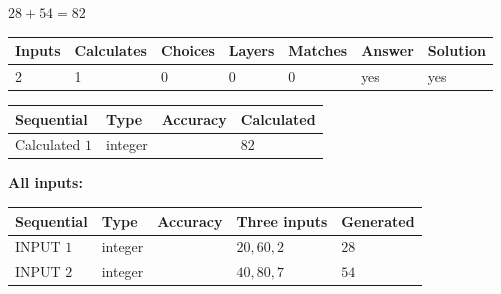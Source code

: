 \documentclass[12pt]{article}
\begin{document}
 
\noindent{}
 
 

$ %
28 +  %
54=   %
82$
 
 
\noindent{}
 
 

 
   
   
   
   
\noindent\begin{tabular}{|l|l|l|l|l|l|l|}
 \hline
Inputs & Calculates & Choices & Layers & Matches & Answer & Solution \\ \hline
 2  & 
 1  & 
 0
  & 
 0  & 
 0  & 
  yes & 
  yes 
  \\ \hline
 \end{tabular}
   
   
   
   
\noindent{}
   
   
  
  
\noindent\begin{tabular}{|l|l|l|l|}
\hline
 Sequential & Type & Accuracy & Calculated \\ 
\hline
 
 
  Calculated $  1 $ & integer &  & 
  $ 82 $ 
 \\  \hline  
 \end{tabular}
   
   
   
   
\noindent\vspace{0.1in}\hspace{-0.08in} {\textbf{\Large{All inputs: }}}
   
   
  
  
\noindent\begin{tabular}{|l|l|l|l|l|}
\hline
 Sequential & Type & Accuracy & Three inputs & Generated \\ 
\hline
 
 
  INPUT $  1 $ & integer &  & $
 20
 , 
 60
 , 
 2
 $ & $ 28 $ 
 \\  \hline  
 
 
  INPUT $  2 $ & integer &  & $
 40
 , 
 80
 , 
 7
 $ & $ 54 $ 
 \\  \hline  
 \end{tabular}
   
   
  
\end{document}
